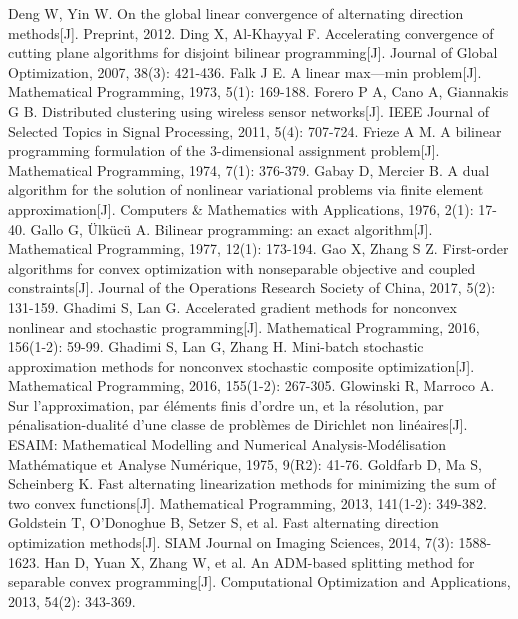 \documentclass[UTF8,10.5pt,a4paper]{ctexart}
\theoremstyle{definition}
\theoremstyle{definition}
\begin{document}
\begin{thebibliography}{MM}
\begin{small}
		 Deng W, Yin W. On the global linear convergence of alternating direction methods[J]. Preprint, 2012.
		 Ding X, Al-Khayyal F. Accelerating convergence of cutting plane algorithms for disjoint bilinear programming[J]. Journal of Global Optimization, 2007, 38(3): 421-436.
		 Falk J E. A linear max—min problem[J]. Mathematical Programming, 1973, 5(1): 169-188.
		 Forero P A, Cano A, Giannakis G B. Distributed clustering using wireless sensor networks[J]. IEEE Journal of Selected Topics in Signal Processing, 2011, 5(4): 707-724.
		 Frieze A M. A bilinear programming formulation of the 3-dimensional assignment problem[J]. Mathematical Programming, 1974, 7(1): 376-379.
		 Gabay D, Mercier B. A dual algorithm for the solution of nonlinear variational problems via finite element approximation[J]. Computers \& Mathematics with Applications, 1976, 2(1): 17-40.
		 Gallo G, Ülkücü A. Bilinear programming: an exact algorithm[J]. Mathematical Programming, 1977, 12(1): 173-194.
		 Gao X, Zhang S Z. First-order algorithms for convex optimization with nonseparable objective and coupled constraints[J]. Journal of the Operations Research Society of China, 2017, 5(2): 131-159.
		 Ghadimi S, Lan G. Accelerated gradient methods for nonconvex nonlinear and stochastic programming[J]. Mathematical Programming, 2016, 156(1-2): 59-99.
		 Ghadimi S, Lan G, Zhang H. Mini-batch stochastic approximation methods for nonconvex stochastic composite optimization[J]. Mathematical Programming, 2016, 155(1-2): 267-305.
		 Glowinski R, Marroco A. Sur l'approximation, par éléments finis d'ordre un, et la résolution, par pénalisation-dualité d'une classe de problèmes de Dirichlet non linéaires[J]. ESAIM: Mathematical Modelling and Numerical Analysis-Modélisation Mathématique et Analyse Numérique, 1975, 9(R2): 41-76.
		 Goldfarb D, Ma S, Scheinberg K. Fast alternating linearization methods for minimizing the sum of two convex functions[J]. Mathematical Programming, 2013, 141(1-2): 349-382.
		 Goldstein T, O'Donoghue B, Setzer S, et al. Fast alternating direction optimization methods[J]. SIAM Journal on Imaging Sciences, 2014, 7(3): 1588-1623.
		 Han D, Yuan X, Zhang W, et al. An ADM-based splitting method for separable convex programming[J]. Computational Optimization and Applications, 2013, 54(2): 343-369.

\end{small}
\end{thebibliography}
\end{document}
